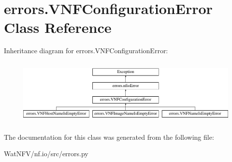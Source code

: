 \hypertarget{classerrors_1_1VNFConfigurationError}{\section{errors.\-V\-N\-F\-Configuration\-Error Class Reference}
\label{classerrors_1_1VNFConfigurationError}
}
Inheritance diagram for errors.\-V\-N\-F\-Configuration\-Error\-:\begin{figure}[H]
\begin{center}
\leavevmode
\includegraphics[height=3.348281cm]{classerrors_1_1VNFConfigurationError}
\end{center}
\end{figure}


The documentation for this class was generated from the following file\-:\begin{DoxyCompactItemize}
\item 
Wat\-N\-F\-V/nf.\-io/src/errors.\-py\end{DoxyCompactItemize}
